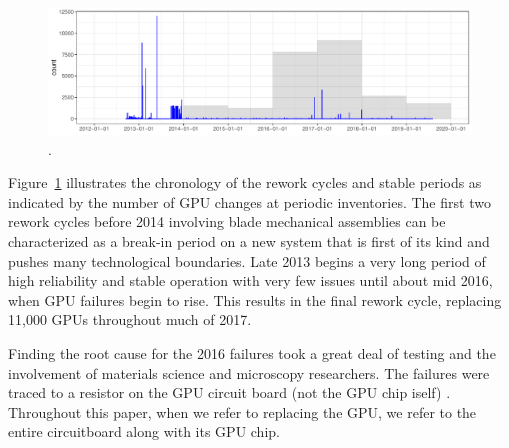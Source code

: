 \begin{figure}[tb]
  \centering
  \includegraphics[width=\textwidth]{figs/chronology001.pdf}
  \caption{.}
  \label{fig:chronology}
\end{figure}
Figure~\ref{fig:chronology} illustrates the chronology of the rework
cycles and stable periods as indicated by the number of GPU changes at
periodic inventories. The first two rework cycles before 2014
involving blade mechanical assemblies can be characterized as a
break-in period on a new system that is first of its kind and pushes
many technological boundaries.  Late 2013 begins a very long
period of high reliability and stable operation with very few issues
until about mid 2016, when GPU failures begin to rise. This results in
the final rework cycle, replacing 11,000 GPUs throughout much of 2017.

Finding the root cause for the 2016 failures took a great deal of
testing and the involvement of materials science and microscopy
researchers. The failures were traced to a resistor on the GPU circuit
board (not the GPU chip iself) . Throughout this paper,
  when we refer to replacing the GPU, we refer to the entire
  circuitboard along with its GPU chip.


